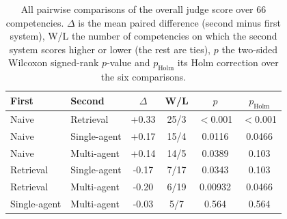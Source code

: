 \begin{table}[t]
\centering
\caption{All pairwise comparisons of the overall judge score over 66 competencies. $\Delta$ is the mean paired difference (second minus first system), W/L the number of competencies on which the second system scores higher or lower (the rest are ties), $p$ the two-sided Wilcoxon signed-rank $p$-value and $p_{\mathrm{Holm}}$ its Holm correction over the six comparisons.}
\label{tab:pairwise}
\small\setlength{\tabcolsep}{4pt}
\begin{tabular}{llcccc}
\hline
First & Second & $\Delta$ & W/L & $p$ & $p_{\mathrm{Holm}}$ \\
\hline
Naive & Retrieval & +0.33 & 25/3 & $<$0.001 & $<$0.001 \\
Naive & Single-agent & +0.17 & 15/4 & 0.0116 & 0.0466 \\
Naive & Multi-agent & +0.14 & 14/5 & 0.0389 & 0.103 \\
Retrieval & Single-agent & -0.17 & 7/17 & 0.0343 & 0.103 \\
Retrieval & Multi-agent & -0.20 & 6/19 & 0.00932 & 0.0466 \\
Single-agent & Multi-agent & -0.03 & 5/7 & 0.564 & 0.564 \\
\hline
\end{tabular}
\end{table}